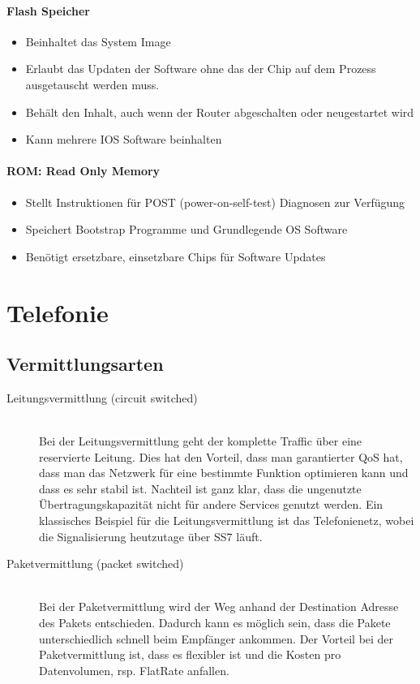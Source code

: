 \paragraph{Flash Speicher}
\begin{itemize}
	\item Beinhaltet das System Image
	\item Erlaubt das Updaten der Software ohne das der Chip auf dem Prozess ausgetauscht werden muss.	
	\item Behält den Inhalt, auch wenn der Router abgeschalten oder neugestartet wird	
	\item Kann mehrere IOS Software beinhalten
\end{itemize}

\paragraph{ROM: Read Only Memory}
\begin{itemize}
	\item Stellt Instruktionen für POST (power-on-self-test) Diagnosen zur Verfügung
	\item Speichert Bootstrap Programme und Grundlegende OS Software
	\item Benötigt ersetzbare, einsetzbare Chips für Software Updates
\end{itemize}

		
\section{Telefonie}
\subsection{Vermittlungsarten}
\begin{description}
	\item[Leitungsvermittlung (circuit switched)] \hfill \\
	Bei der Leitungsvermittlung geht der komplette Traffic über eine reservierte Leitung. Dies hat den Vorteil, dass man garantierter QoS hat, dass man das Netzwerk für eine bestimmte Funktion optimieren kann und dass es sehr stabil ist. Nachteil ist ganz klar, dass die ungenutzte Übertragungskapazität nicht für andere Services genutzt werden. Ein klassisches Beispiel für die Leitungsvermittlung ist das Telefonienetz, wobei die Signalisierung heutzutage über SS7 läuft.
	\item[Paketvermittlung (packet switched)] \hfill \\
	Bei der Paketvermittlung wird der Weg anhand der Destination Adresse des Pakets entschieden. Dadurch kann es möglich sein, dass die Pakete unterschiedlich schnell beim Empfänger ankommen. Der Vorteil bei der Paketvermittlung ist, dass es flexibler ist und die Kosten pro Datenvolumen, rsp. FlatRate anfallen.
\end{description}

